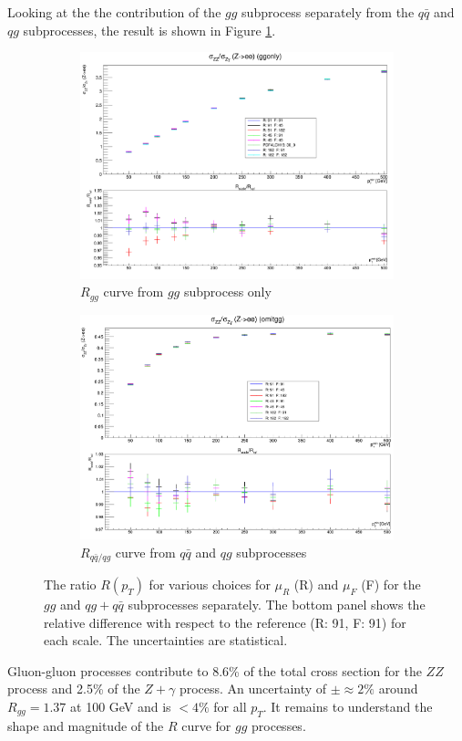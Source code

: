 \documentclass[11pt,a4paper,final]{report}
\begin{document}
Looking at the the contribution of the $gg$ subprocess separately from the $q\bar{q}$ and $qg$ subprocesses, the result is shown in Figure \ref{scale}.
\begin{figure}[H]
\centering
	\begin{subfigure}{0.49\textwidth}
		\includegraphics[width=\linewidth]{scale/ggonly_nlo_scale_overlay.png}
		\caption{$R_{gg}$ curve from $gg$ subprocess only}
	\end{subfigure}
	\begin{subfigure}{0.49\textwidth}
		\includegraphics[width=\linewidth]{scale/omitgg_nlo_scale_overlay.png}
		\caption{$R_{q\bar{q}/qg}$ curve from $q\bar{q}$ and $qg$ subprocesses}
	\end{subfigure}	
\caption{The ratio $R(p_T)$ for various choices for $\mu_R$ (R) and $\mu_F$ (F) for the $gg$ and $qg+q\bar{q}$ subprocesses separately. The bottom panel shows the relative difference with respect to the reference (R: 91, F: 91) for each scale. The uncertainties are statistical.}
\label{scale}
\end{figure}
Gluon-gluon processes contribute to 8.6\% of the total cross section for the $ZZ$ process and 2.5\% of the $Z+\gamma$ process. An uncertainty of $\pm \approx 2\%$ around $R_{gg} = 1.37$ at 100 GeV and is $< 4\%$ for all $p_T$. It remains to understand the shape and magnitude of the $R$ curve for $gg$ processes.
\end{document}
